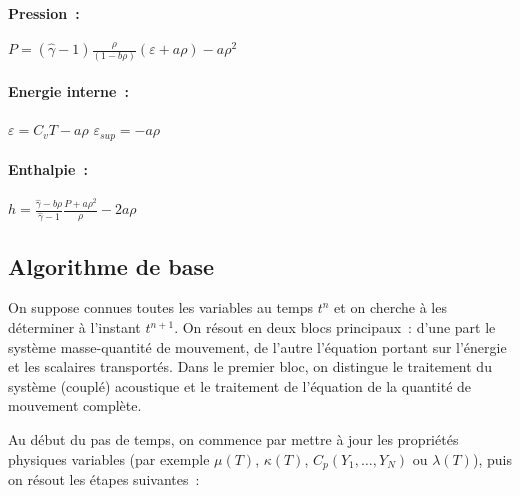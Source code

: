 \paragraph{Pression~:}

$P = (\hat{\gamma} -1) \displaystyle\frac{\rho}{(1-b\rho)}
(\varepsilon + a\rho) - a \rho^2$

\paragraph{Energie interne~:}

$\varepsilon = C_v T - a \rho$\qquad{}
$\varepsilon_{sup} = - a \rho$


\paragraph{Enthalpie~:}

$h = \displaystyle\frac{\hat{\gamma}-b\rho}{\hat{\gamma}-1}
 \displaystyle\frac{P+a\rho^2}{\rho} - 2a\rho$


\subsection*{Algorithme de base}

On suppose connues toutes les variables au temps $t^n$ et on cherche
à les déterminer à l'instant $t^{n+1}$.
On résout en deux blocs principaux~: d'une part le système masse-quantité
de mouvement, de l'autre l'équation portant sur l'énergie et les scalaires
transportés.
Dans le premier bloc, on distingue le traitement du système (couplé)
acoustique et le traitement de l'équation de la quantité de mouvement
complète.

Au début du pas de temps, on commence par mettre à jour
les propriétés physiques variables (par exemple $\mu(T)$, $\kappa(T)$,
$C_p(Y_1,\ldots ,Y_N)$ ou $\lambda(T)$), puis on
résout les étapes suivantes~:

